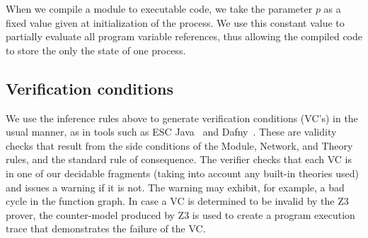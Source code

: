 When we compile a module to executable code, we take the parameter $p$
as a fixed value given at initialization of the process. We use this
constant value to partially evaluate all program variable references,
thus allowing the compiled code to store the only the state of one
process.

\subsection{Verification conditions}

We use the inference rules above to generate verification conditions
(VC's) in the usual manner, as in tools such as ESC Java~\cite{ESC}
and Dafny~\cite{Dafny}. These are validity checks that result from the
side conditions of the Module, Network, and Theory rules, and the
standard rule of consequence. The verifier checks that each VC is in
one of our decidable fragments (taking into account any built-in
theories used) and issues a warning if it is not. The warning may
exhibit, for example, a bad cycle in the function graph. In case a VC
is determined to be invalid by the Z3 prover, the counter-model
produced by Z3 is used to create a program execution trace that
demonstrates the failure of the VC.




%
%
%
